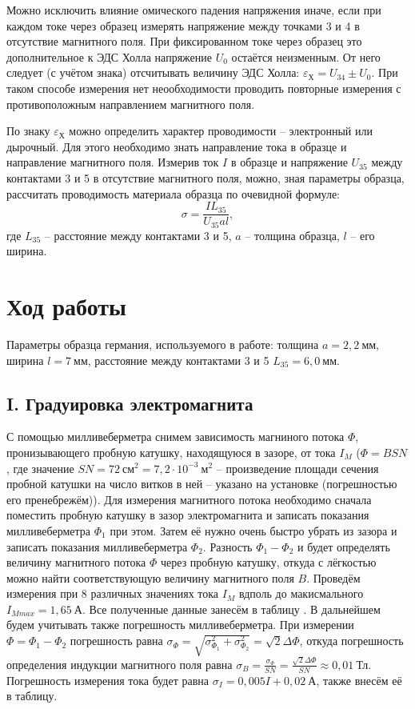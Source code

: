 \documentclass[a4paper,10pt]{article}
\begin{document}
Можно исключить влияние омического падения напряжения иначе, если при каждом токе через образец измерять напряжение между точками 3 и 4 в отсутствие магнитного поля. При фиксированном токе через образец это дополнительное к ЭДС Холла напряжение $U_0$ остаётся неизменным. От него следует (с учётом знака) отсчитывать величину ЭДС Холла: $\varepsilon_{\text{Х}}=U_{34}\pm U_0$. При таком способе измерения нет неообходимости проводить повторные измерения с противоположным направлением магнитного поля.

По знаку $\varepsilon_{\text{Х}}$ можно определить характер проводимости -- электронный или дырочный. Для этого необходимо знать направление тока в образце и направление магнитного поля. Измерив ток $I$ в образце и напряжение $U_{35}$ между контактами 3 и 5 в отсутствие магнитного поля, можно, зная параметры образца, рассчитать проводимость материала образца по очевидной формуле:\[\sigma=\frac{IL_{35}}{U_{35}al},\]где $L_{35}$ -- расстояние между контактами 3 и 5, $a$ -- толщина образца, $l$ -- его ширина.

\section*{Ход работы}

Параметры образца германия, используемого в работе: толщина $a=2,2~\text{мм}$, ширина $l=7~\text{мм}$, расстояние между контактами 3 и 5 $L_{35}=6,0~\text{мм}$.

\subsection{I. Градуировка электромагнита}

С помощью милливеберметра снимем зависимость магниного потока $\Phi$, пронизывающего пробную катушку, находящуюся в зазоре, от тока $I_M$ ($\Phi=BSN$, где значение $SN=72~\text{см}^2=7,2\cdot10^{-3}~\text{м}^2$ -- произведение площади сечения пробной катушки на число витков в ней -- указано на установке (погрешностью его пренебрежём)). Для измерения магнитного потока необходимо сначала поместить пробную катушку в зазор электромагнита и записать показания милливеберметра $\Phi_1$ при этом. Затем её нужно очень быстро убрать из зазора и записать показания милливеберметра $\Phi_2$. Разность $\Phi_1-\Phi_2$ и будет определять величину магнитного потока $\Phi$ через пробную катушку, откуда с лёгкостью можно найти соответствующую величину магнитного поля $B$. Проведём измерения при 8 различных значениях тока $I_M$ вдполь до макисмального $I_{Mmax}=1,65~\text{А}$. Все полученные данные занесём в таблицу . В дальнейшем будем учитывать также погрешность милливеберметра. При измерении $\Phi=\Phi_1-\Phi_2$ погрешность равна $\sigma_{\Phi}=\sqrt{\sigma_{\Phi_1}^2+\sigma_{\Phi_2}^2}=\sqrt2\Delta\Phi$, откуда погрешность определения индукции магнитного поля равна $\sigma_B=\frac{\sigma_{\Phi}}{SN}=\frac{\sqrt2\Delta\Phi}{SN}\approx0,01~\text{Тл}$. Погрешность измерения тока будет равна $\sigma_I=0,005I+0,02~\text{А}$, также внесём её в таблицу.
\end{document}
